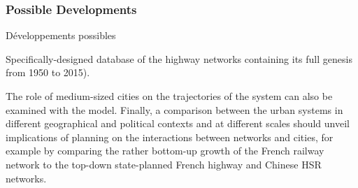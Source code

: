 





\subsubsection{Possible Developments}{Développements possibles}


Specifically-designed database of the highway networks containing its full genesis from 1950 to 2015).


The role of medium-sized cities on the trajectories of the system can also be examined with the model. Finally, a comparison between the urban systems in different geographical and political contexts and at different scales should unveil implications of planning on the interactions between networks and cities, for example by comparing the rather bottom-up growth of the French railway network to the top-down state-planned French highway and Chinese HSR networks.










